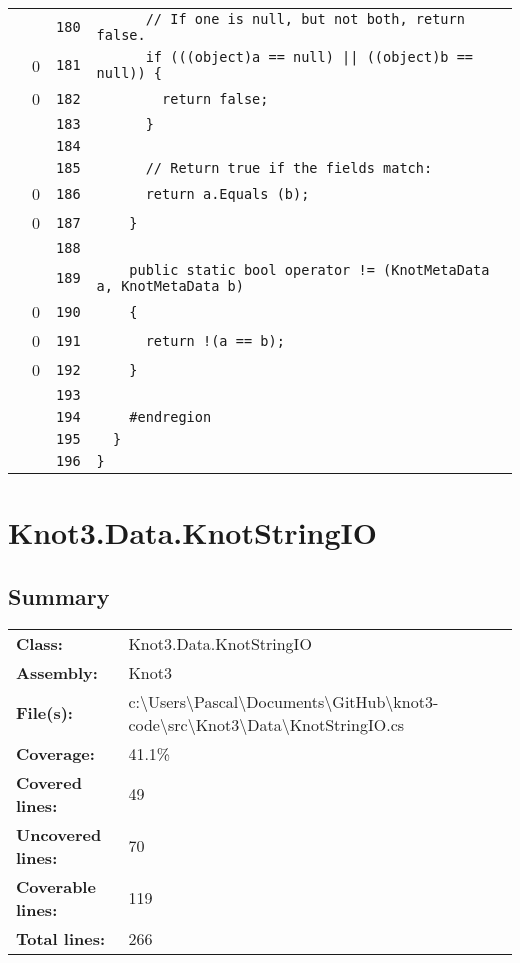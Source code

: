 \documentclass[a4paper,10pt]{article}
\begin{document}
\begin{longtable}[l]{lrrl}
\cellcolor{gray} &  & \verb~180~ & \verb~      // If one is null, but not both, return false.~\\
\cellcolor{red} & 0 & \verb~181~ & \verb~      if (((object)a == null) || ((object)b == null)) {~\\
\cellcolor{red} & 0 & \verb~182~ & \verb~        return false;~\\
\cellcolor{gray} &  & \verb~183~ & \verb~      }~\\
\cellcolor{gray} &  & \verb~184~ & \verb~~\\
\cellcolor{gray} &  & \verb~185~ & \verb~      // Return true if the fields match:~\\
\cellcolor{red} & 0 & \verb~186~ & \verb~      return a.Equals (b);~\\
\cellcolor{red} & 0 & \verb~187~ & \verb~    }~\\
\cellcolor{gray} &  & \verb~188~ & \verb~~\\
\cellcolor{gray} &  & \verb~189~ & \verb~    public static bool operator != (KnotMetaData a, KnotMetaData b)~\\
\cellcolor{red} & 0 & \verb~190~ & \verb~    {~\\
\cellcolor{red} & 0 & \verb~191~ & \verb~      return !(a == b);~\\
\cellcolor{red} & 0 & \verb~192~ & \verb~    }~\\
\cellcolor{gray} &  & \verb~193~ & \verb~~\\
\cellcolor{gray} &  & \verb~194~ & \verb~    #endregion~\\
\cellcolor{gray} &  & \verb~195~ & \verb~  }~\\
\cellcolor{gray} &  & \verb~196~ & \verb~}~\\
\end{longtable}
\newpage
\section{Knot3.Data.KnotStringIO}
\subsection{Summary}
\begin{longtable}[l]{ll}
\textbf{Class:} & Knot3.Data.KnotStringIO\\
\textbf{Assembly:} & Knot3\\
\textbf{File(s):} & \begin{minipage}[t]{12cm}{c:\textbackslash Users\textbackslash Pascal\textbackslash Documents\textbackslash GitHub\textbackslash knot3-code\textbackslash src\textbackslash Knot3\textbackslash Data\textbackslash KnotStringIO.cs}\end{minipage} \\
\textbf{Coverage:} & 41.1\%\\
\textbf{Covered lines:} & 49\\
\textbf{Uncovered lines:} & 70\\
\textbf{Coverable lines:} & 119\\
\textbf{Total lines:} & 266\\
\end{longtable}
\end{document}
